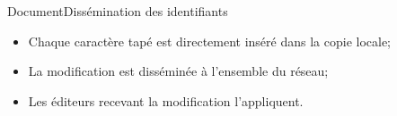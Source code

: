 \begin{frame}{Document}{Dissémination des identifiants}

    \hspace{-1cm}
  \begin{minipage}{0.55\textwidth}
    \begin{itemize}
      \vspace{0.5cm}
    \item Chaque caractère tapé est directement inséré dans la copie locale;
    \item La modification est disséminée à l'ensemble du réseau;
    \item Les éditeurs recevant la modification l'appliquent.
    \end{itemize}
  \end{minipage}
  \hfill
  \begin{minipage}{0.44\textwidth}
    \begin{center}
      
    \end{center}
  \end{minipage}

  
  \vspace{1cm}
  \large
  \begin{itemize}
  \end{itemize}



\end{frame}


